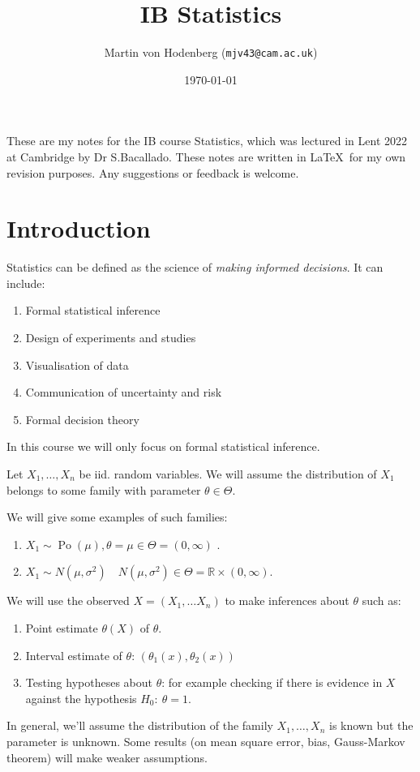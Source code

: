 \documentclass[a4paper]{scrartcl}
\title{IB Statistics}
\author{Martin von Hodenberg (\texttt{mjv43@cam.ac.uk})}
\date{\today}
\begin{document}
\maketitle

These are my notes for the IB course Statistics, which was lectured in Lent 2022 at Cambridge by Dr S.Bacallado. These notes are written in \LaTeX  \ for my own revision purposes. Any suggestions or feedback is welcome.



\tableofcontents
\newpage

\section{Introduction}
Statistics can be defined as the science of \emph{making informed decisions}. It can include:
\begin{enumerate}
    \item Formal statistical inference
    \item Design of experiments and studies
    \item Visualisation of data
    \item Communication of uncertainty and risk
    \item Formal decision theory
\end{enumerate}
In this course we will only focus on formal statistical inference.
\begin{definition}
     Let $X_1 , \ldots , X_n$ be iid. random variables. We will assume the distribution of $X_1 $ belongs to some family with parameter $\theta \in \Theta$.
\end{definition}
\begin{example}
    We will give some examples of such families:
     \begin{enumerate}
         \item $X_1 \sim \operatorname{Po}(\mu), \theta=\mu \in \Theta=(0,\infty )$ .
         \item $X_1 \sim N (\mu, \sigma^2) \quad N (\mu, \sigma^2)\in \Theta=\mathbb{R} \times (0, \infty)$.
     \end{enumerate}
\end{example}
We will use the observed $X= (X_1 , \ldots X_n)$ to make inferences about $\theta$ such as:
\begin{enumerate}
    \item Point estimate $\theta (X)$ of $\theta$.
    \item Interval estimate of $\theta$: $(\theta_1 (x),\theta_2 (x))$ 
    \item Testing hypotheses about $\theta$: for example checking if there is evidence in $X$ against the hypothesis $H_0 : \ \theta=1$.
\end{enumerate}
\begin{remark}
     In general, we'll assume the distribution of the family $X_1 , \ldots , X_n$ is known but the parameter is unknown. Some results (on mean square error, bias, Gauss-Markov theorem) will make weaker assumptions.
\end{remark}
\end{document}
